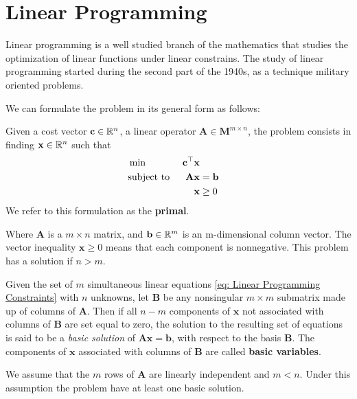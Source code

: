 \chapter{Linear Programming}
Linear programming is a well studied branch of the mathematics that studies the optimization of linear functions under linear constrains. The study of linear programming started during the second part of the 1940s, as a technique military oriented problems.

We can formulate the problem in its general form as follows:

\begin{problem}
\label{pro: Linear Programming General Formulation.}
Given a cost vector $\mathbf{c}\in \mathbb{R}^n$, a linear operator $\mathbf{A} \in \mathbf M^{m\times n}$, the problem consists in finding $\mathbf{x}\in\mathbb{R}^n$ such that 
\begin{align}
	&\min & \mathbf{c}^\top\mathbf{x} \label{eq: Linear Programming Min}&\\
	&\text{subject to }& \mathbf{A}\mathbf{x}&=\mathbf{b} & \label{eq: Linear Programming Constraints} \\
	& &\mathbf{x}&\geq 0 & \label{eq: Linear Programming cone}
\end{align} 
We refer to this formulation as the \textbf{primal}.
\end{problem}
Where $\mathbf{A}$ is a $m\times n$ matrix, and $\mathbf{b}\in\mathbb{R}^m$ is an m-dimensional column vector. The vector inequality $\mathbf{x}\geq 0$ means that each component is nonnegative. This problem has a solution if $n>m$. 

\begin{definition}
	Given the set of $m$ simultaneous linear equations \eqref{eq: Linear Programming Constraints} with $n$ unknowns, let $\mathbf{B}$ be any nonsingular $m\times m$ submatrix made up of columns of $\mathbf{A}$. Then if all $n-m$ components of $\mathbf{x}$ not associated with columns of $\mathbf{B}$ are set equal to zero, the solution to the resulting set of equations is said to be a \textit{basic solution} of $\mathbf{Ax}=\mathbf{b}$, with respect to the basis $\mathbf{B}$. The components of $\mathbf{x}$ associated with columns of $\mathbf{B}$ are called \textbf{basic variables}.
\end{definition}

We assume that the $m$ rows of $\mathbf{A}$ are linearly independent and $m<n$. Under this assumption the problem have at least one basic solution.

